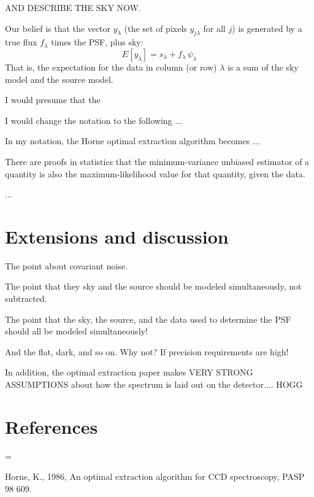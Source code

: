 \documentclass[12pt, letterpaper]{article}
\begin{document}
AND DESCRIBE THE SKY NOW.

Our belief is that the vector $y_{\lambda}$ (the set of pixels
$y_{j\lambda}$ for all $j$) is generated by a true flux $f_{\lambda}$
times the PSF, plus sky:
\begin{equation}
E[y_\lambda] = s_\lambda + f_\lambda\,\psi_\lambda
\end{equation}
That is, the expectation for the data in column (or row) $\lambda$ is
a sum of the sky model and the source model.

I would presume that the 

I would change the notation to the following ...

In my notation, the Horne optimal extraction algorithm becomes ...

There are proofs in statistics that the minimum-variance unbiased
estimator of a quantity is also the maximum-likelihood value for that
quantity, given the data.

...

\section{Extensions and discussion}

The point about covariant noise.

The point that they sky and the source should be modeled
simultaneously, not subtracted.

The point that the sky, the source, and the data used to determine the
PSF should all be modeled simultaneously!

And the flat, dark, and so on. Why not? If precision requirements are
high!

In addition, the optimal extraction paper makes VERY STRONG
ASSUMPTIONS about how the spectrum is laid out on the
detector.... HOGG

\section*{References}
\begin{list}{}{%
\rightmargin=0in
\leftmargin=\parindent
{}\leftmargin
{}\leftmargin
}
\item Horne, K., 1986,
An optimal extraction algorithm for CCD spectroscopy,
PASP 98 609.
\end{list}
\end{document}
